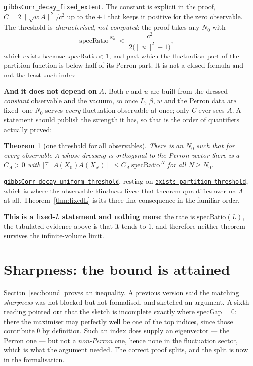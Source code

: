 \documentclass[11pt]{article}
\newtheorem{theorem}{Theorem}[section]
\theoremstyle{definition}
\newcommand{\anchor}{9704b3f3c0d576bb40c43caa5360fbd64dfa1643}
\newcommand{\osline}[3]{%
  \href{https://github.com/lluiseriksson/THE-ERIKSSON-PROGRAMME/blob/\anchor/YangMills/OS/#1.lean\#L#2}{\nolinkurl{#3}}}
\begin{document}
\osline{SpatialSpectral}{805}{gibbsCorr\_decay\_fixed\_extent}.
The constant is explicit in the proof, $C = 2\|\sqrt{w}A\|^{2}/c^{2}$ up to the
$+1$ that keeps it positive for the zero observable.  The threshold is
\emph{characterised, not computed}: the proof takes any $N_0$ with
\[
  \mathrm{specRatio}^{\,N_0} \;<\; \frac{c^{2}}{2\bigl(\|u\|^{2}+1\bigr)} ,
\]
which exists because $\mathrm{specRatio}<1$, and past which the fluctuation
part of the partition function is below half of its Perron part.  It is not a
closed formula and not the least such index.

\textbf{And it does not depend on $A$.}  Both $c$ and $u$ are built from the
dressed \emph{constant} observable and the vacuum, so once $L$, $\beta$, $w$ and
the Perron data are fixed, one $N_0$ serves \emph{every} fluctuation observable
at once; only $C$ ever sees $A$.  A statement should publish the strength it
has, so that is the order of quantifiers actually proved:

\begin{theorem}[one threshold for all observables]\label{thm:uniformN0}
There is an $N_0$ such that for \emph{every} observable $A$ whose dressing is
orthogonal to the Perron vector there is a $C_A>0$ with
$\bigl|\mathbb{E}[A(X_0)A(X_N)]\bigr| \le C_A\,\mathrm{specRatio}^{\,N}$ for all
$N \ge N_0$.
\end{theorem}

\osline{SpatialSpectral}{764}{gibbsCorr\_decay\_uniform\_threshold}, resting on
\osline{SpatialSpectral}{702}{exists\_partition\_threshold}, which is where
the observable-blindness lives: that theorem quantifies over no $A$ at all.
Theorem~\ref{thm:fixedL} is its three-line consequence in the familiar order.

\textbf{This is a fixed-$L$ statement and nothing more}: the
rate is $\mathrm{specRatio}(L)$, the tabulated evidence above is that it tends
to $1$, and therefore neither theorem survives the infinite-volume limit.

\section{Sharpness: the bound is attained}\label{sec:sharp}

Section~\ref{sec:bound} proves an inequality.  A previous version said the
matching \emph{sharpness} was not blocked but not formalised, and sketched an
argument.  A sixth reading pointed out that the sketch is incomplete exactly
where $\mathrm{specGap}=0$: there the maximiser may perfectly well be one of the
top indices, since those contribute $0$ by definition.  Such an index does
supply an eigenvector --- the Perron one --- but not a \emph{non-Perron} one,
hence none in the fluctuation sector, which is what the argument needed.  The
correct proof splits, and the split is now in the formalisation.
\end{document}
